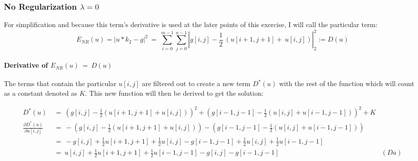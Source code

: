 \documentclass{report}
\begin{document}
			\subsubsection{No Regularization $\lambda = 0$}
			\startsubsection
				For simplification and because this term's derivative is used at the later points of this exercise, I will call the particular term:
				\vspace{-0.4cm}
				\[
					E_{NR}(u) = | u \ast k_2 - g | ^2 \ = \ \sum_{i=0}^{m-1} \sum_{j=0}^{n-1} | g[i,j] - \frac{1}{2} \ (u[i+1,j+1] + \ u[i,j]) | _2 ^2 := D(u)
				\]
				\vspace{-0.8cm} \paragraph{Derivative of  $E_{NR}(u) \ = \ D(u)$}
				\startsubsection
					The terms that contain the particular $u[i,j]$ are filtered out to create a new term $D^*(u)$ with the rest of the function which will count as a constant denoted as $K$. This new function will then be derived to get the solution:
					\begin{adjustwidth}{-4em}{}
					\vspace{-0.5cm}
						\begin{align*}
							D^*(u) \ & = \ (g[i,j] - \frac{1}{2} (u[i+1,j+1] + u[i,j]))^2 + (g[i-1,j-1] - \frac{1}{2} (u[i,j] + u[i-1,j-1]))^2 + K \\
							\frac{\partial D^*(u)}{\partial u[i,j]} \ & = \ - (g[i,j] - \frac{1}{2} (u[i+1,j+1] + u[i,j])) - (g[i-1,j-1] - \frac{1}{2} (u[i,j] + u[i-1,j-1])) \\
							& = \ - g[i,j] + \frac{1}{2} u[i+1,j+1] + \frac{1}{2} u[i,j] - g[i-1,j-1] + \frac{1}{2} u[i,j] + \frac{1}{2} u[i-1,j-1] \\
							& = \ u[i,j]  + \frac{1}{2} u[i+1,j+1] + \frac{1}{2} u[i-1,j-1] - g[i,j] - g[i-1,j-1] & (Da)
						\end{align*}
					\end{adjustwidth}
				\closesection
			\closesection
\end{document}
